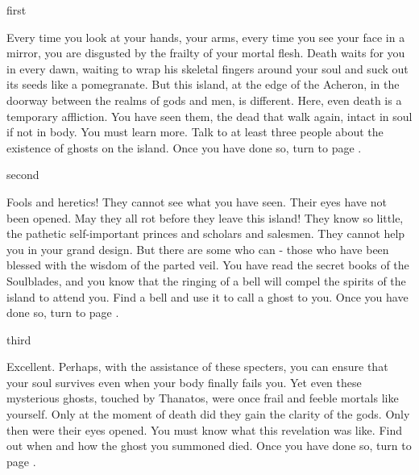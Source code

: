 \documentclass[greennotebook]{Kos}
\begin{document}

\startnotebook{\nStrengthInAnarchy{}}

\begin{page}{first}

Every time you look at your hands, your arms, every time you see your face in a mirror, you are disgusted by the frailty of your mortal flesh. Death waits for you in every dawn, waiting to wrap his skeletal fingers around your soul and suck out its seeds like a pomegranate. But this island, at the edge of the Acheron, in the doorway between the realms of gods and men, is different. Here, even death is a temporary affliction. You have seen them, the dead that walk again, intact in soul if not in body. You must learn more. Talk to at least three people about the existence of ghosts on the island. Once you have done so, turn to page .

\end{page}

\begin{page}{second}

Fools and heretics! They cannot see what you have seen. Their eyes have not been opened. May they all rot before they leave this island! They know so little, the pathetic self-important princes and scholars and salesmen. They cannot help you in your grand design. But there are some who can - those who have been blessed with the wisdom of the parted veil. You have read the secret books of the Soulblades, and you know that the ringing of a bell will compel the spirits of the island to attend you. Find a bell and use it to call a ghost to you. Once you have done so, turn to page .

\end{page}

\begin{page}{third}

Excellent. Perhaps, with the assistance of these specters, you can ensure that your soul survives even when your body finally fails you. Yet even these mysterious ghosts, touched by Thanatos, were once frail and feeble mortals like yourself. Only at the moment of death did they gain the clarity of the gods. Only then were their eyes opened. You must know what this revelation was like. Find out when and how the ghost you summoned died. Once you have done so, turn to page .

\end{page}
\end{document}
